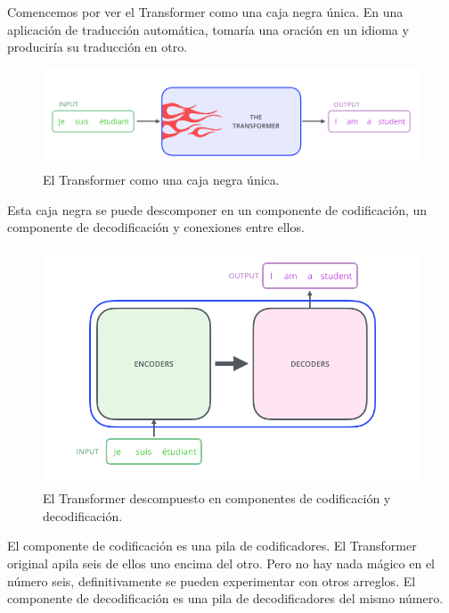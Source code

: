 Comencemos por ver el Transformer como una caja negra única. En una aplicación de traducción automática, tomaría una oración en un idioma y produciría su traducción en otro.


\begin{figure}[h]
  \centering
  \includegraphics[scale=0.29]{pics/the_transformer_3.png}
  \caption{El Transformer como una caja negra única.}
\end{figure}

Esta caja negra se puede descomponer en un componente de codificación, un componente de decodificación y conexiones entre ellos.
\begin{figure}[h]
  \centering
  \includegraphics[scale=0.29]{pics/The_transformer_encoders_decoders.png}
  \caption{El Transformer descompuesto en componentes de codificación y decodificación.}
\end{figure}

El componente de codificación es una pila de codificadores. El Transformer original apila seis de ellos uno encima del otro. Pero no hay nada mágico en el número seis, definitivamente se pueden experimentar con otros arreglos. El componente de decodificación es una pila de decodificadores del mismo número.

